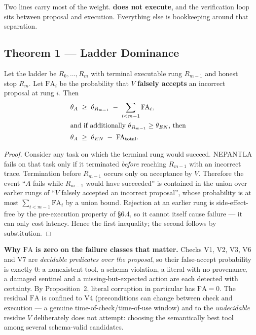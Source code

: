 Two lines carry most of the weight. 
\textbf{does not execute}, and the verification loop sits between proposal and
execution. Everything else is bookkeeping around that separation.

\subsection{Theorem 1 --- Ladder Dominance}
\label{sec:ladder-dominance}

\setcounter{theorem}{0}
\begin{theorem}
\label{thm:dominance}
Let the ladder be $R_0, \dots, R_{m}$ with terminal executable rung $R_{m-1}$
and honest stop $R_m$. Let $\mathrm{FA}_i$ be the probability that $V$
\textbf{falsely accepts} an incorrect proposal at rung $i$. Then
\begin{align*}
  \theta_{A} \;&\ge\; \theta_{R_{m-1}} \;-\; \sum_{i<m-1}\mathrm{FA}_i ,\\
  \intertext{and if additionally $\theta_{R_{m-1}} \ge \theta_{EN}$, then}
  \theta_{A} \;&\ge\; \theta_{EN} \;-\; \mathrm{FA}_{\text{total}} .
\end{align*}
\end{theorem}

\begin{proof}
Consider any task on which the terminal rung would succeed. NEPANTLA fails on
that task only if it terminated \emph{before} reaching $R_{m-1}$ with an
incorrect trace. Termination before $R_{m-1}$ occurs only on acceptance by $V$.
Therefore the event ``$A$ fails while $R_{m-1}$ would have succeeded'' is
contained in the union over earlier rungs of ``$V$ falsely accepted an incorrect
proposal'', whose probability is at most $\sum_{i<m-1}\mathrm{FA}_i$ by a union
bound. Rejection at an earlier rung is side-effect-free by the pre-execution
property of \S6.4, so it cannot itself cause failure --- it can only cost
latency. Hence the first inequality; the second follows by substitution.
\end{proof}

\textbf{Why $\mathrm{FA}$ is zero on the failure classes that matter.} Checks
V1, V2, V3, V6 and V7 are \emph{decidable predicates over the proposal}, so
their false-accept probability is exactly $0$: a nonexistent tool, a schema
violation, a literal with no provenance, a damaged sentinel and a
missing-but-expected action are each detected with certainty. By
Proposition~2, literal corruption in particular has $\mathrm{FA}=0$. The
residual $\mathrm{FA}$ is confined to V4 (preconditions can change between check
and execution --- a genuine time-of-check/time-of-use window) and to the
\emph{undecidable} residue $V$ deliberately does not attempt: choosing the
semantically best tool among several schema-valid candidates.

